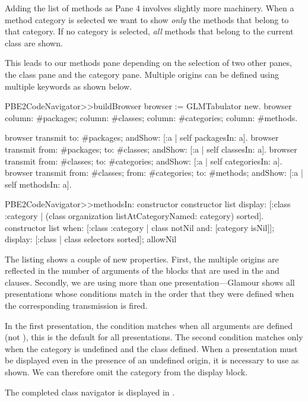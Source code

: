 \documentclass[a4paper,10pt,twoside]{book}
\begin{document}
Adding the list of methods as Pane 4 involves slightly more machinery. 
When a method category is selected we want to show \emph{only} the methods
that belong to that category. If no category is selected, \emph{all} methods that belong to the current class are shown.

This leads to our methods pane depending on the selection of two other
panes, the class pane and the category pane. Multiple origins can be
defined using multiple  keywords as shown below.

\begin{code}{}
PBE2CodeNavigator>>buildBrowser
  browser := GLMTabulator new.
  browser
    column: #packages;
    column: #classes;
    column: #categories;
    column: #methods.

  browser transmit to: #packages; andShow: [:a | self packagesIn: a].
  browser transmit from: #packages; to: #classes; andShow: [:a | self classesIn: a].
  browser transmit from: #classes; to: #categories; andShow: [:a | self categoriesIn: a].
  browser transmit from: #classes; from: #categories; to: #methods; 
  		andShow: [:a | self methodsIn: a].

PBE2CodeNavigator>>methodsIn: constructor
  constructor list
    display: [:class :category | 
    			(class organization listAtCategoryNamed: category) sorted].
  constructor list
    when: [:class :category | class notNil and: [category isNil]];
    display: [:class | class selectors sorted];
    allowNil
\end{code}


The listing shows a couple of new properties. First, the multiple origins are reflected in the number of
arguments of the blocks that are used in the  and
 clauses. Secondly, we are using more than one
presentation---Glamour shows all presentations whose conditions match in
the order that they were defined when the corresponding transmission
is fired.

In the first presentation, the condition matches when all arguments
are defined (not ), this is the default for all presentations. The
second condition matches only when the category is undefined and the class defined. When a presentation must be displayed even in the
presence of an undefined origin, it is necessary to use  as
shown. We can therefore omit the category from the display block.

The completed class navigator is displayed in .
\end{document}
